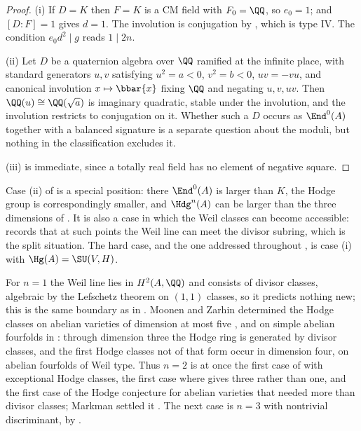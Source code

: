 \begin{proof}
(i) If $D=K$ then $F=K$ is a CM field with $F_{0}=\QQ$, so $e_{0}=1$; and
$[D:F]=1$ gives $d=1$. The involution is conjugation by
, which is type IV. The condition $e_{0}d^{2}\mid g$ reads
$1\mid 2n$.

(ii) Let $D$ be a quaternion algebra over $\QQ$ ramified at the infinite place,
with standard generators $u,v$ satisfying $u^{2}=a<0$, $v^{2}=b<0$, $uv=-vu$,
and canonical involution $x\mapsto\bbar{x}$ fixing $\QQ$ and negating
$u,v,uv$. Then $\QQ(u)\cong\QQ(\sqrt{a})$ is imaginary quadratic, stable under
the involution, and the involution restricts to conjugation on it. Whether
such a $D$ occurs as $\End^{0}(A)$ together with a balanced signature
is a separate question about the moduli, but nothing in the classification
excludes it.

(iii) is immediate, since a totally real field has no element of negative
square.
\end{proof}

\begin{remark}\label{rem:genericcase}
Case (ii) of  is a special position: there
$\End^{0}(A)$ is larger than $K$, the Hodge group is correspondingly smaller,
and $\Hdg^{n}(A)$ can be larger than the three dimensions of
. It is also a case in which the Weil classes can become
accessible: \cite[Remark~2.5]{paperIII} records that at such points the Weil line can
meet the divisor subring, which is the split situation. The hard case, and the
one addressed throughout , is
case (i) with $\Hg(A)=\SU(V,H)$.
\end{remark}

\begin{remark}\label{rem:dimfour}
For $n=1$ the Weil line lies in $H^{2}(A,\QQ)$ and consists of divisor
classes, algebraic by the Lefschetz theorem on $(1,1)$ classes, so it predicts
nothing new; this is the same boundary as in . Moonen and
Zarhin determined the Hodge classes on abelian varieties of dimension at most
five \cite{MZ99}, and on simple abelian fourfolds in \cite{MZ95}: through
dimension three the Hodge ring is generated by divisor classes, and the first
Hodge classes not of that form occur in dimension four, on abelian fourfolds of
Weil type. Thus $n=2$ is at once the first case of  with
exceptional Hodge classes, the first case where  gives
three rather than one, and the first case of the Hodge conjecture for
abelian varieties that needed more than divisor classes; Markman settled it
\cite[Corollary 1.6.1]{Mar25a}. The next case is $n=3$ with nontrivial
discriminant, by \cite[Proposition~2.12(ii)]{paperIII}.
\end{remark}
